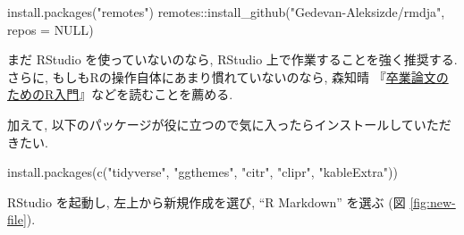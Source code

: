 \documentclass[
  xelatex,ja=standard,jafont=noto]{bxjsbook}
\newenvironment{Shaded}{\begin{snugshade}}{\end{snugshade}}
\newcommand{\AttributeTok}[1]{\textcolor[rgb]{0.77,0.63,0.00}{#1}}
\newcommand{\ConstantTok}[1]{\textcolor[rgb]{0.00,0.00,0.00}{#1}}
\newcommand{\FunctionTok}[1]{\textcolor[rgb]{0.00,0.00,0.00}{#1}}
\newcommand{\NormalTok}[1]{#1}
\newcommand{\SpecialCharTok}[1]{\textcolor[rgb]{0.00,0.00,0.00}{#1}}
\newcommand{\StringTok}[1]{\textcolor[rgb]{0.31,0.60,0.02}{#1}}
\theoremstyle{definition}
\theoremstyle{definition}
\theoremstyle{definition}
\theoremstyle{definition}
\theoremstyle{remark}
\begin{document}
\begin{Shaded}
\begin{Highlighting}[numbers=left,,]
\FunctionTok{install.packages}\NormalTok{(}\StringTok{"remotes"}\NormalTok{)}
\NormalTok{remotes}\SpecialCharTok{::}\FunctionTok{install\_github}\NormalTok{(}\StringTok{"Gedevan{-}Aleksizde/rmdja"}\NormalTok{, }\AttributeTok{repos =} \ConstantTok{NULL}\NormalTok{)}
\end{Highlighting}
\end{Shaded}

まだ RStudio を使っていないのなら, RStudio
上で作業することを強く推奨する. さらに,
もしもRの操作自体にあまり慣れていないのなら, 森知晴
『\href{https://tomoecon.github.io/R_for_graduate_thesis/}{卒業論文のためのR入門}』などを読むことを薦める.

加えて,
以下のパッケージが役に立つので気に入ったらインストールしていただきたい.

\begin{Shaded}
\begin{Highlighting}[numbers=left,,]
\FunctionTok{install.packages}\NormalTok{(}\FunctionTok{c}\NormalTok{(}\StringTok{"tidyverse"}\NormalTok{, }\StringTok{"ggthemes"}\NormalTok{, }\StringTok{"citr"}\NormalTok{, }\StringTok{"clipr"}\NormalTok{, }\StringTok{"kableExtra"}\NormalTok{))}
\end{Highlighting}
\end{Shaded}

RStudio を起動し, 左上から新規作成を選び, ``R Markdown'' を選ぶ (図
\ref{fig:new-file}).
\end{document}
